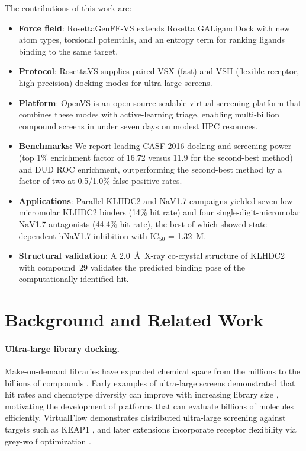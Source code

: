 The contributions of this work are:
\begin{itemize}
  \item \textbf{Force field}: RosettaGenFF-VS extends Rosetta GALigandDock
  \citep{leman2020rosetta} with new atom types, torsional potentials, and an
  entropy term for ranking ligands binding to the same target.
  \item \textbf{Protocol}: RosettaVS supplies paired VSX (fast) and VSH
  (flexible-receptor, high-precision) docking modes for ultra-large screens.
  \item \textbf{Platform}: OpenVS is an open-source scalable virtual
  screening platform that combines these modes with active-learning triage,
  enabling multi-billion compound screens in under seven days on modest HPC
  resources.
  \item \textbf{Benchmarks}: We report leading CASF-2016 docking and
  screening power (top 1\% enrichment factor of 16.72 versus 11.9 for the
  second-best method) and DUD ROC enrichment, outperforming the second-best
  method by a factor of two at 0.5/1.0\% false-positive rates.
  \item \textbf{Applications}: Parallel KLHDC2 and NaV1.7 campaigns yielded
  seven low-micromolar KLHDC2 binders (14\% hit rate) and four
  single-digit-micromolar NaV1.7 antagonists (44.4\% hit rate), the best of
  which showed state-dependent hNaV1.7 inhibition with IC$_{50}$ = 1.32~\textmu M.
  \item \textbf{Structural validation}: A 2.0~\AA\ X-ray co-crystal structure
  of KLHDC2 with compound~29 validates the predicted binding pose of the
  computationally identified hit.
\end{itemize}

\section{Background and Related Work}

\paragraph{Ultra-large library docking.}
Make-on-demand libraries have expanded chemical space from the millions to
the billions of compounds \citep{lyu2019ultralarge,tingle2023zinc22}. Early
examples of ultra-large screens demonstrated that hit rates and chemotype
diversity can improve with increasing library size
\citep{lyu2019ultralarge,gorgulla2020virtualflow}, motivating the development
of platforms that can evaluate billions of molecules efficiently.
VirtualFlow demonstrates distributed ultra-large screening against targets
such as KEAP1 \citep{gorgulla2020virtualflow}, and later extensions
incorporate receptor flexibility via grey-wolf optimization
\citep{gorgulla2020virtualflowgwo}.

